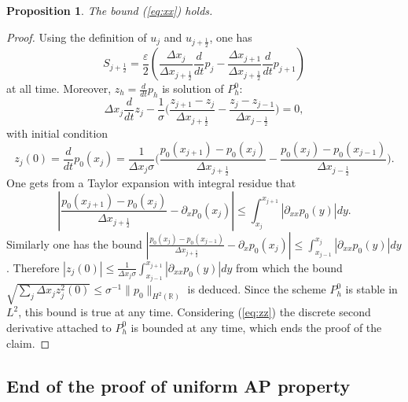 \documentclass[a4paper,french,english,10pt]{article}
\newcommand\eps{\varepsilon}
\newtheorem{proposition}[theorem]{Proposition}
\begin{document}
\begin{proposition}\label{pro:H1}
The bound (\ref{eq:xx}) holds.
\end{proposition}

\begin{proof}

Using the definition of $u_j$
and $u_{j+\frac12 }$, one has 
$$
S_{j+\frac12 }=\frac{\eps}{2}\left( \frac{ \Delta x_j}{\Delta x_{j+\frac12}}
\frac{d}{dt} p_j - \frac{\Delta x_{j+1}}{\Delta x_{j+\frac12}} \frac{d}{dt} p_{j+1} \right)
$$
 at all time.
Moreover, $z_h=\frac{d}{dt} p_h$ is solution of
$P_h^0$:
$$
\Delta x_j\frac{d}{dt} z_j -\frac{1}{\sigma } \bigg(
\frac{z_{j+1}-z_j}{\Delta x_{j+\frac12 }}-\frac{z_j -z_{j-1}}{\Delta
x_{j-\frac12 }}\bigg)=0,
$$
with initial condition
\begin{equation}\label{eq:zz}
z_j(0)=\frac{d}{dt} p_0(x_j)=
\frac1 {\Delta x_j \sigma } \bigg(
\frac{p_0(x_{j+1})-p_0(x_j)}{\Delta x_{j+\frac12 }}-\frac{p_0(x_j)
 -p_0(x_{j-1}  )}{\Delta
x_{j-\frac12 }}\bigg).
\end{equation}
One gets from a Taylor expansion with integral residue
that
$$
\left|
\frac{p_0( x_{j+1}) -p_0(x_j)}{\Delta x_{j+\frac12 }}- 
\partial_x p _0(x_j)
\right|\leq 
 \int_{x_j}^{x_{j+1}  } \left|\partial_{xx}p_0(y)   \right| dy .$$ 
Similarly one has the bound
$
\left|
 \frac{p_0( x_{j}) -p_0(x_{j-1})}{\Delta x_{j+\frac12 }}-
\partial_x p _0(x_j)\right|
\leq
 \int_{x_{j-1}}^{x_{j}  } \left|\partial_{xx}p_0(y)   \right| dy $.
Therefore $|z_j(0)|\leq
\frac1 {\Delta x_j \sigma }  \int_{x_{j-1}}^{x_{j+1}  } \left|\partial_{xx}p_0(y)  
 \right| dy $ from which the bound
$
\sqrt{ \sum_j \Delta x_j z_j^2(0) }
\leq \sigma^{-1}\|p_0\|_{H^2(\mathbb{R})}$
is deduced.
Since the scheme $P_h^0$ is stable in $L^2$, this bound is true at any time.
Considering (\ref{eq:zz}) the discrete second derivative
attached to $P_h^0$ is bounded at any time, which ends the proof
of the claim.
\end{proof} 

\subsection{End of the proof of uniform AP property}
\end{document}
